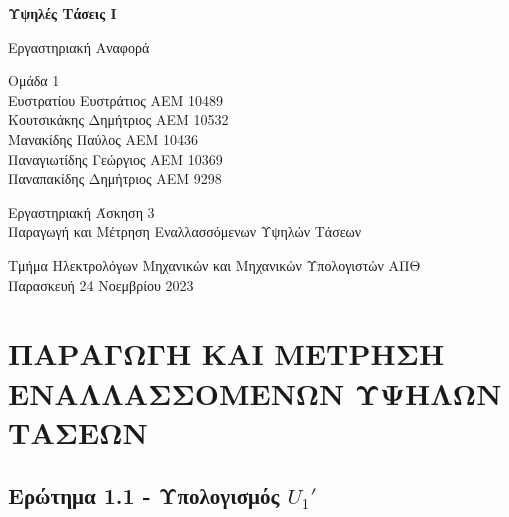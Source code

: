 \documentclass[titlepage, 12pt, a4paper]{article}
\begin{document}
\begin{titlepage}
\begin{center}
    \vspace*{1cm}
            
    \Huge
    \textbf{Υψηλές Τάσεις Ι}
            
    \vspace{0.5cm}
    \LARGE
    Εργαστηριακή Αναφορά
            
    \vspace{2.5cm}
    \LARGE     
    Ομάδα 1\\
    \Large
    \vspace{0.2cm}
    Ευστρατίου Ευστράτιος ΑΕΜ 10489\\
    \vspace{0.2cm}
    Κουτσικάκης Δημήτριος ΑΕΜ 10532\\
    \vspace{0.2cm}
    Μανακίδης Παύλος ΑΕΜ 10436\\
    \vspace{0.2cm}
    Παναγιωτίδης Γεώργιος ΑΕΜ 10369\\
    \vspace{0.2cm}
    Παναπακίδης Δημήτριος ΑΕΜ 9298
            
    \vfill
    \Large        
    Εργαστηριακή Άσκηση 3\\
    Παραγωγή και Μέτρηση Εναλλασσόμενων Υψηλών Τάσεων
            
    \vspace{0.8cm}
            
    \large
    Τμήμα Ηλεκτρολόγων Μηχανικών και Μηχανικών Υπολογιστών ΑΠΘ\\
    Παρασκευή 24 Νοεμβρίου 2023
            

\end{center}
\date{Χειμερινό Εξάμηνο 2023-2024}
\end{titlepage}

\justifying

\vspace{1cm}
\section*{ΠΑΡΑΓΩΓΗ ΚΑΙ ΜΕΤΡΗΣΗ ΕΝΑΛΛΑΣΣΟΜΕΝΩΝ ΥΨΗΛΩΝ ΤΑΣΕΩΝ}
\vspace{0.3cm}
\subsection*{Ερώτημα 1.1 - Υπολογισμός $U_1'$}
\end{document}
